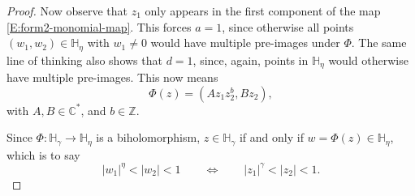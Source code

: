 \documentclass[letterpaper,11pt,reqno]{amsart}
\theoremstyle{plain}
\theoremstyle{definition}
\theoremstyle{remark}
\theoremstyle{remark}
\numberwithin{equation}{section}
\newcommand{\C}{{\mathbb C}}
\newcommand{\D}{{\mathbb D}}
\newcommand{\h}{{\mathbb H}}
\newcommand{\R}{{\mathbb R}}
\newcommand{\Z}{{\mathbb Z}}
\begin{document}
\begin{proof}
Now observe that $z_1$ only appears in the first component of the map \eqref{E:form2-monomial-map}.
This forces $a=1$, since otherwise all points $(w_1,w_2) \in \h_\eta$ with $w_1 \neq 0$ would have multiple pre-images under $\Phi$.
The same line of thinking also shows that $d=1$, since, again, points in $\h_\eta$ would otherwise have multiple pre-images.
This now means
\begin{equation}\label{E:form3-monomial-map}
\Phi(z) = (Az_1 z_2^b, B z_2),
\end{equation}
with $A,B \in \C^*$, and $b \in \Z$.


Since $\Phi : \h_\gamma \to \h_\eta$ is a biholomorphism, $z \in \h_\gamma$ if and only if $w = \Phi(z) \in \h_\eta$, which is to say
\begin{equation}\label{E:biholo-form1} 
|w_1|^\eta < |w_2| < 1 \qquad \Longleftrightarrow \qquad |z_1|^\gamma < |z_2| < 1. 
\end{equation}


\end{proof}
\end{document}
